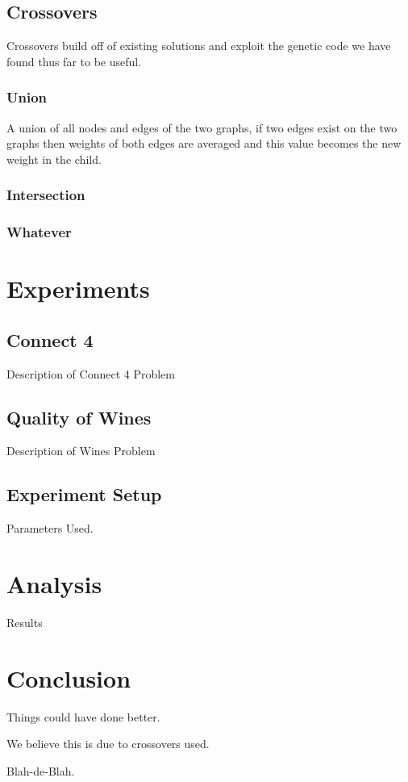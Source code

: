 \documentclass[journal]{IEEEtran}
\begin{document}
  \subsection{Crossovers}
  Crossovers build off of existing solutions and exploit the genetic code we have found thus far to be useful. 
    \subsubsection{Union}
	A union of all nodes and edges of the two graphs, if two edges exist on the two graphs then weights of both edges are averaged and this value becomes the new weight in the child.
    \subsubsection{Intersection}
    \subsubsection{Whatever}
    
\section{Experiments}
  \subsection{Connect 4}
    Description of Connect 4 Problem
  \subsection{Quality of Wines}
    Description of Wines Problem
  \subsection{Experiment Setup}
    Parameters Used.
  
\section{Analysis}
Results

\section{Conclusion}
Things could have done better.

We believe this is due to crossovers used.

Blah-de-Blah.


\end{document}
